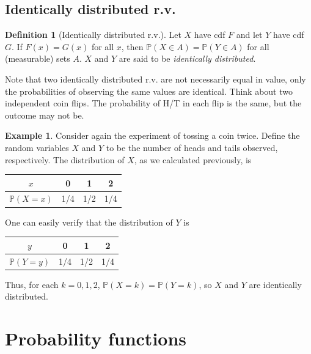 \documentclass[
]{book}
\newcommand{\bbP}{\mathbb{P}}
\theoremstyle{definition}
\newtheorem{definition}{Definition}[chapter]
\theoremstyle{definition}
\newtheorem{example}{Example}[chapter]
\theoremstyle{definition}
\theoremstyle{definition}
\theoremstyle{remark}
\begin{document}
\hypertarget{identically-distributed-r.v.}{%
\subsection{Identically distributed r.v.}\label{identically-distributed-r.v.}}

\begin{definition}[Identically distributed r.v.]
Let \(X\) have cdf \(F\) and let \(Y\) have cdf \(G\).
If \(F(x)=G(x)\) for all \(x\), then \(\bbP(X\in A) = \bbP(Y \in A)\) for all (measurable) sets \(A\).
\(X\) and \(Y\) are said to be \emph{identically distributed}.
\end{definition}

Note that two identically distributed r.v. are not necessarily equal in value, only the probabilities of observing the same values are identical.
Think about two independent coin flips. The probability of H/T in each flip is the same, but the outcome may not be.

\begin{example}
Consider again the experiment of tossing a coin twice.
Define the random variables \(X\) and \(Y\) to be the number of heads and tails observed, respectively.
The distribution of \(X\), as we calculated previously, is

\begin{longtable}[]{@{}cccc@{}}
\toprule
\(x\) & 0 & 1 & 2 \\
\midrule
\endhead
\(\bbP(X=x)\) & 1/4 & 1/2 & 1/4 \\
\bottomrule
\end{longtable}

One can easily verify that the distribution of \(Y\) is

\begin{longtable}[]{@{}cccc@{}}
\toprule
\(y\) & 0 & 1 & 2 \\
\midrule
\endhead
\(\bbP(Y=y)\) & 1/4 & 1/2 & 1/4 \\
\bottomrule
\end{longtable}

Thus, for each \(k=0,1,2\), \(\bbP(X=k)=\bbP(Y=k)\), so \(X\) and \(Y\) are identically distributed.
\end{example}

\hypertarget{probability-functions}{%
\section{Probability functions}\label{probability-functions}}
\end{document}
